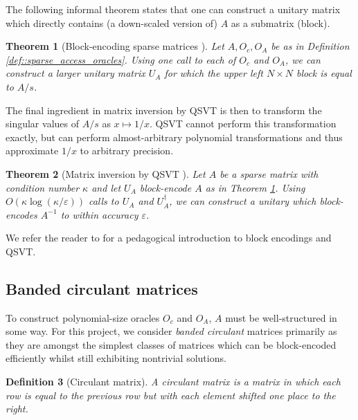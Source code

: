 \documentclass[10pt, twocolumn]{article}
\newtheorem{theorem}{Theorem}[section]
\newtheorem{definition}[theorem]{Definition}
\begin{document}
The following informal theorem states that one can construct a unitary matrix which directly contains (a down-scaled version of) $A$ as a submatrix (block).

\begin{theorem}[Block-encoding sparse matrices \cite{gilyen2019quantum, camps2203explicit}]
	\label{thm::block_encoding_sparse_matrices}
	Let $A, O_c, O_A$ be as in Definition \ref{def::sparse_access_oracles}. Using one call to each of $O_c$ and $O_A$, we can construct a larger unitary matrix $U_A$ for which the upper left $N \times N$ block is equal to $A/s$.
\end{theorem}

The final ingredient in matrix inversion by QSVT is then to transform the singular values of $A/s$ as $x \mapsto 1/x$. QSVT cannot perform this transformation exactly, but can perform almost-arbitrary polynomial transformations \cite{sunderhauf2023generalized} and thus approximate $1/x$ to arbitrary precision.

\begin{theorem}[Matrix inversion by QSVT \cite{gilyen2019quantum}]
	\label{thm::matrix_inversion_by_qsvt}
	Let $A$ be a sparse matrix with condition number $\kappa$ and let $U_A$ block-encode $A$ as in Theorem \ref{thm::block_encoding_sparse_matrices}. Using $O(\kappa \log(\kappa / \varepsilon))$ calls to $U_A$ and $U_A^\dag$, we can construct a unitary which block-encodes $A^{-1}$ to within accuracy $\varepsilon$.
\end{theorem}

We refer the reader to \cite{martyn2021grand} for a pedagogical introduction to block encodings and QSVT.

\subsection{Banded circulant matrices}

To construct polynomial-size oracles $O_c$ and $O_A$, $A$ must be well-structured in some way. For this project, we consider \textit{banded circulant} matrices primarily as they are amongst the simplest classes of matrices which can be block-encoded efficiently whilst still exhibiting nontrivial solutions.

\begin{definition}[Circulant matrix]
	A circulant matrix is a matrix in which each row is equal to the previous row but with each element shifted one place to the right.
\end{definition}
\end{document}
